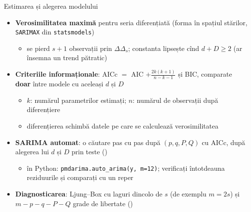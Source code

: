 \begin{frame}{Estimarea și alegerea modelului}
\itemsize{\small}
\begin{itemize}
    \item \textbf{Verosimilitatea maximă} pentru seria diferențiată (forma în spațiul stărilor, \texttt{SARIMAX} din \texttt{statsmodels})
    \begin{itemize}
        \item se pierd $s + 1$ observații prin $\Delta\Delta_s$; constanta lipsește cînd $d + D \ge 2$ (ar însemna un trend pătratic)
    \end{itemize}
    \item \textbf{Criteriile informaționale}: AICc $=$ AIC $+ \frac{2k(k + 1)}{n - k - 1}$ și BIC, comparate \textbf{doar} între modele cu aceleași $d$ și $D$
    \begin{itemize}
        \item $k$: numărul parametrilor estimați; $n$: numărul de observații după diferențiere
        \item diferențierea schimbă datele pe care se calculează verosimilitatea
    \end{itemize}
    \item \textbf{SARIMA automat}: o căutare pas cu pas după $(p, q, P, Q)$ cu AICc, după alegerea lui $d$ și $D$ prin teste ()
    \begin{itemize}
        \item în Python: \texttt{pmdarima.auto\_arima(y, m=12)}; verificați întotdeauna reziduurile și comparați cu un reper
    \end{itemize}
    \item \textbf{Diagnosticarea}: Ljung--Box cu laguri dincolo de $s$ (de exemplu $m = 2s$) și $m - p - q - P - Q$ grade de libertate ()
\end{itemize}
\end{frame}

